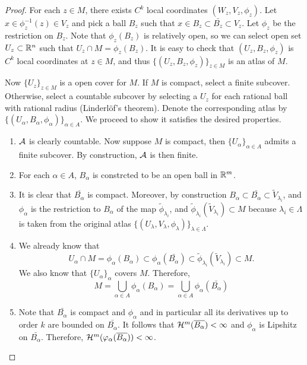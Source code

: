 \documentclass[a4paper]{article}
\begin{document}
\begin{proof}
For each $z \in M$, there exists $C^k$ local coordinates 
$(W_z, V_z, \phi_z)$. Let $x \in \phi_z^{-1}(z) \in V_z$
and pick a ball $B_z$ such that $x \in B_z \subset \bar{B_z}
\subset V_z$. Let $\phi_z$ be the restriction on $B_z$.
Note that $\phi_z(B_z)$ is relatively open, so we can select 
open set $U_z \subset \mathbb{R}^n$ such that $U_z \cap M = \phi_z 
(B_z)$. It is easy to check that $(U_z, B_z, \phi_z)$ 
is $C^k$ local coordinates at $z \in M$, and thus 
$\{(U_z, B_z, \phi_z)\}_{z \in M}$ is an atlas of $M$. 

Now $\{U_z\}_{z \in M}$ is a open cover for $M$. If $M$ 
is compact, select a finite subcover. Otherwise, select 
a countable subcover by selecting a $U_z$ for each 
rational ball with rational radius (Linderl\"of's theorem). 
Denote the corresponding atlas by 
$\{(U_\alpha, B_\alpha, \phi_\alpha)\}_{\alpha \in A}$.
We proceed to show it satisfies the desired properties.

\begin{enumerate}
\item $\mathcal{A}$ is clearly countable. Now suppose $M$ is 
compact, then $\{U_\alpha\}_{\alpha \in A}$ admits a finite 
subcover. By construction, $\mathcal{A}$ is then finite.

\item For each $\alpha \in A$, $B_{\alpha}$ is constrcted
to be an open ball in $\mathbb{R}^m$.

\item It is clear that $\bar{B_{\alpha}}$ is compact.
Moreover, by construction $B_{\alpha} 
\subset \bar{B_{\alpha}} \subset \tilde{V}_{\lambda_i}$, and 
$\phi_{\alpha}$ is the restriction to $B_{\alpha}$
of the map $\tilde{\phi}_{\lambda_i}$, 
and $\tilde{\phi}_{\lambda_i}(\tilde{V}_{\lambda_i}) 
\subset M$ because 
$\lambda_i \in \Lambda$ is taken from the original atlas 
$\{(U_\lambda, V_\lambda, \phi_\lambda)\}_{\lambda \in \Lambda}$.

\item We already know that 
\[
U_\alpha \cap M 
= \phi_{\alpha} (B_{\alpha})
\subset \phi_{\alpha} ( \bar{B_{\alpha}} )
\subset \tilde{\phi}_{\lambda_i} (\tilde{V}_{\lambda_i}) 
\subset M.
\]
We also know that $\{U_\alpha\}_{\alpha}$ covers $M$.
Therefore, 
\[
M = \bigcup_{\alpha \in A} \phi_{\alpha} (B_{\alpha})
= \bigcup_{\alpha \in A} \phi_{\alpha} (\bar{B_{\alpha}})
\]

\item Note that $\bar{B_\alpha}$ is compact and $\phi_\alpha$
and in particular all its derivatives up to order $k$ are bounded on 
$\bar{B_\alpha}$. It follows that 
$\mathcal{H}^m (\overline{B_\alpha}) < \infty$ and 
$\phi_\alpha$ is Lipshitz on $\bar{B_\alpha}$. 
Therefore, $\mathcal{H}^m (\varphi_\alpha 
(\overline{B_\alpha})) < \infty$. 


\end{enumerate}
\end{proof}
\end{document}
